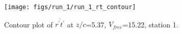 \begin{figure}[H]
\centering
\texttt{[image: figs/run\_1/run\_1\_rt\_contour]}
\caption{Contour plot of $\overline{r^\prime t^\prime}$ at $z/c$=5.37, $V_{free}$=15.22, station 1.}
\label{fig:run_1_rt_contour}
\end{figure}


